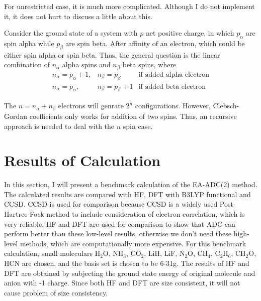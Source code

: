 For unrestricted case, it is much more complicated.
Although I do not implement it, it does not hurt to discuss a little about this.

Consider the ground state of a system with $p$ net positive charge, in which $p_{\alpha}$ are spin alpha while $p_{\beta}$ are spin beta.
After affinity of an electron, which could be either spin alpha or spin beta.
Thus, the general question is the linear combination of $n_{\alpha}$ alpha spins and $n_{\beta}$ beta spins, where
\begin{equation}
	\begin{array}{lll}
		n_{\alpha}=p_{\alpha} + 1, & n_{\beta}=p_{\beta} & \text{if added alpha electron}
		\\
		n_{\alpha}=p_{\alpha}, & n_{\beta}=p_{\beta} + 1 & \text{if added beta electron}
	\end{array}
\end{equation}

The $n=n_{\alpha} + n_{\beta}$ electrons will genrate $2^n$ configurations.
However, Clebsch-Gordan coefficients only works for addition of two spins.
Thus, an recursive approach is needed to deal with the $n$ spin case.

\section{Results of Calculation}

In this section, I will present a benchmark calculation of the EA-ADC(2) method.
The calculated results are compared with HF, DFT with B3LYP functional and CCSD.
CCSD is used for comparison because CCSD is a widely used Post-Hartree-Fock method to include consideration of electron correlation, which is very reliable.
HF and DFT are used for comparison to show that ADC can perform better than these low-level results, otherwise we don't need these high-level methods, which are computationally more expensive.
For this benchmark calculation, small moleculars 
$\text{H}_2\text{O}$, $\text{NH}_3$, $\text{CO}_2$, $\text{LiH}$,
$\text{LiF}$, $\text{N}_2\text{O}$, $\text{CH}_4$,
$\text{C}_2\text{H}_6$, $\text{CH}_2\text{O}$, $\text{HCN}$ are chosen, and the basis set is chosen to be 6-31g.
The results of HF and DFT are obtained by subjecting the ground state energy of original molecule and anion with -1 charge.
Since both HF and DFT are size consistent, it will not cause problem of size consistency.


